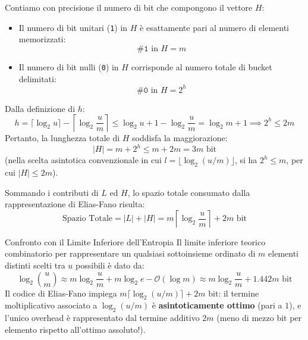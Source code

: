 Contiamo con precisione il numero di bit che compongono il vettore $H$:
\begin{itemize}
  \item Il numero di bit unitari (\texttt{1}) in $H$ \`e esattamente pari al numero di elementi memorizzati:
  \begin{equation}
    \#\texttt{1} \text{ in } H = m
  \end{equation}
  \item Il numero di bit nulli (\texttt{0}) in $H$ corrisponde al numero totale di bucket delimitati:
  \begin{equation}
    \#\texttt{0} \text{ in } H = 2^h
  \end{equation}
\end{itemize}
Dalla definizione di $h$:
\begin{equation}
  h = \lceil \log_2 u \rceil - \left\lceil \log_2 \frac{u}{m} \right\rceil \le \log_2 u + 1 - \log_2 \frac{u}{m} = \log_2 m + 1 \implies 2^h \le 2m
\end{equation}
Pertanto, la lunghezza totale di $H$ soddisfa la maggiorazione:
\begin{equation}
  |H| = m + 2^h \le m + 2m = 3m \text{ bit}
\end{equation}
(nella scelta asintotica convenzionale in cui $l = \lfloor \log_2 (u/m) \rfloor$, si ha $2^h \le m$, per cui $|H| \le 2m$).

Sommando i contributi di $L$ ed $H$, lo spazio totale consumato dalla rappresentazione di Elias-Fano risulta:
\begin{equation}
  \text{Spazio Totale} = |L| + |H| = m \left\lceil \log_2 \frac{u}{m} \right\rceil + 2m \text{ bit}
\end{equation}

\begin{noteblock}{Confronto con il Limite Inferiore dell'Entropia}
Il limite inferiore teorico combinatorio per rappresentare un qualsiasi sottoinsieme ordinato di $m$ elementi distinti scelti tra $u$ possibili \`e dato da:
\begin{equation}
  \log_2 \binom{u}{m} \approx m \log_2 \frac{u}{m} + m \log_2 e - \mathcal{O}(\log m) \approx m \log_2 \frac{u}{m} + 1.442 m \text{ bit}
\end{equation}
Il codice di Elias-Fano impiega $m \lceil \log_2(u/m) \rceil + 2m$ bit: il termine moltiplicativo associato a $\log_2(u/m)$ \`e \textbf{asintoticamente ottimo} (pari a $1$), e l'unico overhead \`e rappresentato dal termine additivo $2m$ (meno di mezzo bit per elemento rispetto all'ottimo assoluto!).
\end{noteblock}

